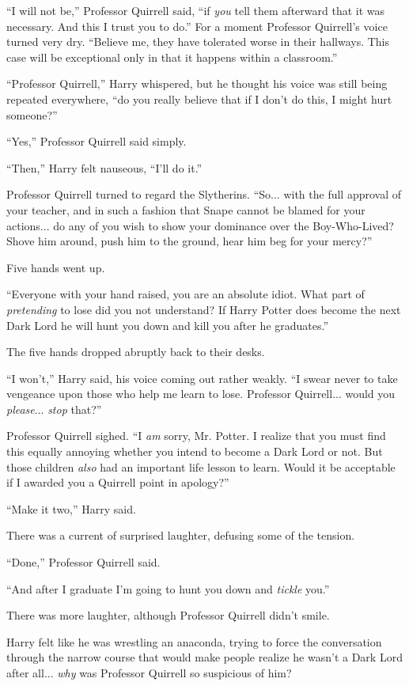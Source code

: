 ``I will not be,'' Professor Quirrell said, ``if \emph{you} tell them afterward that it was necessary. And this I trust you to do.'' For a moment Professor Quirrell's voice turned very dry. ``Believe me, they have tolerated worse in their hallways. This case will be exceptional only in that it happens within a classroom.''

``Professor Quirrell,'' Harry whispered, but he thought his voice was still being repeated everywhere, ``do you really believe that if I don't do this, I might hurt someone?''

``Yes,'' Professor Quirrell said simply.

``Then,'' Harry felt nauseous, ``I'll do it.''

Professor Quirrell turned to regard the Slytherins. ``So... with the full approval of your teacher, and in such a fashion that Snape cannot be blamed for your actions... do any of you wish to show your dominance over the Boy-Who-Lived? Shove him around, push him to the ground, hear him beg for your mercy?''

Five hands went up.

``Everyone with your hand raised, you are an absolute idiot. What part of \emph{pretending} to lose did you not understand? If Harry Potter does become the next Dark Lord he will hunt you down and kill you after he graduates.''

The five hands dropped abruptly back to their desks.

``I won't,'' Harry said, his voice coming out rather weakly. ``I swear never to take vengeance upon those who help me learn to lose. Professor Quirrell... would you \emph{please}... \emph{stop} that?''

Professor Quirrell sighed. ``I \emph{am} sorry, Mr. Potter. I realize that you must find this equally annoying whether you intend to become a Dark Lord or not. But those children \emph{also} had an important life lesson to learn. Would it be acceptable if I awarded you a Quirrell point in apology?''

``Make it two,'' Harry said.

There was a current of surprised laughter, defusing some of the tension.

``Done,'' Professor Quirrell said.

``And after I graduate I'm going to hunt you down and \emph{tickle} you.''

There was more laughter, although Professor Quirrell didn't smile.

Harry felt like he was wrestling an anaconda, trying to force the conversation through the narrow course that would make people realize he wasn't a Dark Lord after all... \emph{why} was Professor Quirrell so suspicious of him?


